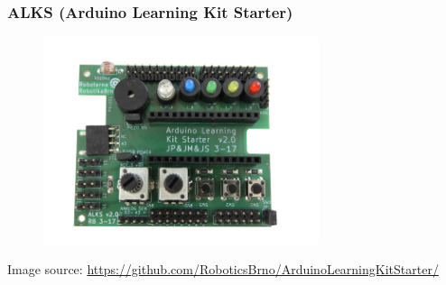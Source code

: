\documentclass[12;pt,t]{beamer} %
\newcommand{\srctext}[1]{{\fontsize{7}{9}\selectfont\textcolor{sourcesclr}{#1}}}
\begin{document}
\begin{frame}
\frametitle{ALKS (Arduino Learning Kit Starter)}

	\begin{figure}[H]
		\includegraphics[width=0.72\textwidth]{img/ALKS_v2_0_3_00_top_white_background.png}
	\end{figure}
	
	\srctext{Image source: \url{https://github.com/RoboticsBrno/ArduinoLearningKitStarter/}}
\end{frame}
\end{document}
